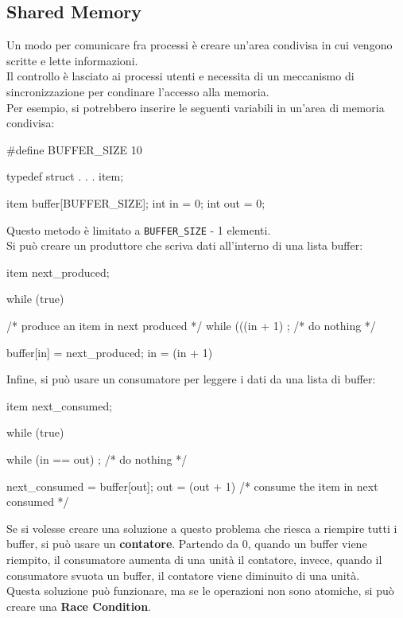 \subsection{Shared Memory}
Un modo per comunicare fra processi è creare un'area condivisa in cui vengono scritte e lette informazioni. \\
Il controllo è lasciato ai processi utenti e necessita di un meccanismo di sincronizzazione per condinare l'accesso alla memoria. \\ 
\vspace*{0.01\textheight}
Per esempio, si potrebbero inserire le seguenti variabili in un'area di memoria condivisa:
\begin{clang}
#define BUFFER_SIZE 10

typedef struct {
  . . .
} item;

item buffer[BUFFER_SIZE];
int in = 0;
int out = 0;
\end{clang}
Questo metodo è limitato a \texttt{BUFFER\_SIZE} - 1 elementi. \\
Si può creare un produttore che scriva dati all'interno di una lista buffer:
\begin{clang}[Producer]
item next_produced;

while (true) {
  /* produce an item in next produced */
  while (((in + 1) %
    ; /* do nothing */
  
  buffer[in] = next_produced;
  in = (in + 1) %
}
\end{clang}
Infine, si può usare un consumatore per leggere i dati da una lista di buffer:
\begin{clang}[Consumer]
item next_consumed;

while (true) {
  while (in == out)
    ; /* do nothing */

  next_consumed = buffer[out];
  out = (out + 1) %
  /* consume the item in next consumed */
}
\end{clang}

Se si volesse creare una soluzione a questo problema che riesca a riempire tutti i buffer, si può usare un \textbf{contatore}. 
Partendo da 0, quando un buffer viene riempito, il consumatore aumenta di una unità il contatore, invece, quando il consumatore svuota un buffer, il contatore viene diminuito di una unità. \\ 
Questa soluzione può funzionare, ma se le operazioni non sono atomiche, si può creare una \textbf{Race Condition}.

